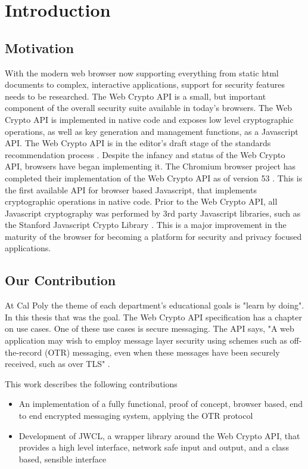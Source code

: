 \chapter{Introduction}


\section{Motivation}


With the modern web browser now supporting everything from static html documents to complex, interactive applications, support for security features needs to be researched. The Web Crypto API is a small, but important component of the overall security suite available in today's browsers. The Web Crypto API is implemented in native code and exposes low level cryptographic operations, as well as key generation and management functions, as a Javascript API. The Web Crypto API is in the editor's draft stage of the standards recommendation process \cite{webcrypto-overview}. Despite the infancy and status of the Web Crypto API, browsers have began implementing it. The Chromium browser project has completed their implementation of the Web Crypto API as of version 53 \cite{webcrypto-chromium}. This is the first available API for browser based Javascript, that implements cryptographic operations in native code. Prior to the Web Crypto API, all Javascript cryptography was performed by 3rd party Javascript libraries, such as the Stanford Javascript Crypto Library \cite{sjcl-library}. This is a major improvement in the maturity of the browser for becoming a platform for security and privacy focused applications. 


\section{Our Contribution}


At Cal Poly the theme of each department's educational goals is "learn by doing". In this thesis that was the goal. The Web Crypto API specification has a chapter on use cases. One of these use cases is secure messaging. The API says, "A web application may wish to employ message layer security using schemes such as off-the-record (OTR) messaging, even when these messages have been securely received, such as over TLS" \cite{webcrypto-overview}. 


This work describes the following contributions 

\begin{itemize}  
\item An implementation of a fully functional, proof of concept, browser based, end to end encrypted messaging system, applying the OTR protocol
\item Development of JWCL, a wrapper library around the Web Crypto API, that provides a high level interface, network safe input and output, and a class based, sensible interface
\end{itemize}



